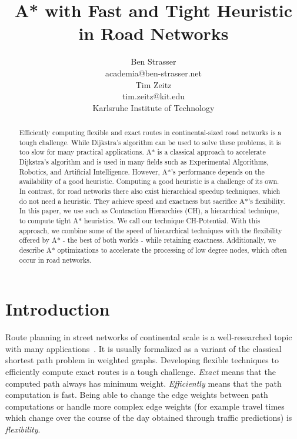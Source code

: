 \documentclass[letterpaper]{article} %
\title{A* with Fast and Tight Heuristic in Road Networks}
\author{Ben Strasser\\
academia@ben-strasser.net\\
\And
Tim Zeitz\\
tim.zeitz@kit.edu\\
Karlsruhe Institute of Technology
}
\begin{document}
\maketitle


\begin{abstract}
Efficiently computing flexible and exact routes in continental-sized road networks is a tough challenge.
While Dijkstra's algorithm can be used to solve these problems, it is too slow for many practical applications.
A* is a classical approach to accelerate Dijkstra's algorithm and is used in many fields such as Experimental Algorithms, Robotics, and Artificial Intelligence.
However, A*'s performance depends on the availability of a good heuristic.
Computing a good heuristic is a challenge of its own.
In contrast, for road networks there also exist hierarchical speedup techniques, which do not need a heuristic.
They achieve speed and exactness but sacrifice A*'s flexibility.
In this paper, we use such as Contraction Hierarchies (CH), a hierarchical technique, to compute tight A* heuristics.
We call our technique CH-Potential.
With this approach, we combine some of the speed of hierarchical techniques with the flexibility offered by A* - the best of both worlds - while retaining exactness.
Additionally, we describe A* optimizations to accelerate the processing of low degree nodes, which often occur in road networks.
\end{abstract}

\section{Introduction}
\label{sec:intro}
Route planning in street networks of continental scale is a well-researched topic with many applications~\cite{bdgmpsww-rptn-16}.
It is usually formalized as a variant of the classical shortest path problem in weighted graphs.
Developing flexible techniques to efficiently compute exact routes is a tough challenge.
\emph{Exact} means that the computed path always has minimum weight.
\emph{Efficiently} means that the path computation is fast.
Being able to change the edge weights between path computations or handle more complex edge weights (for example travel times which change over the course of the day obtained through traffic predictions) is \emph{flexibility}.
\end{document}
